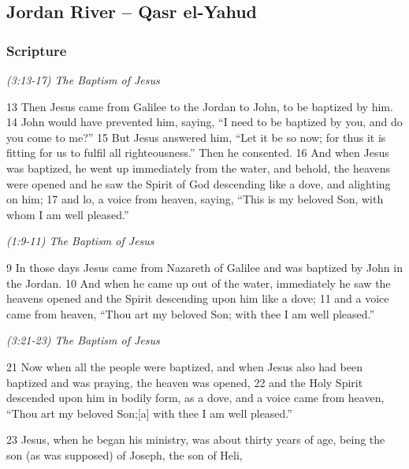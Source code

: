 \documentclass[letterpaper]{report}
\begin{document}
\clearpage
\subsection{Jordan River -- Qasr el-Yahud}
\begin{multicols}{2}
	\mbox{}
\end{multicols}
\subsubsection{Scripture}

{\centering
	\emph{(3:13-17) The Baptism of Jesus}\\
}
\begin{multicols}{2}
13 Then Jesus came from Galilee to the Jordan to John, to be baptized by him. 14 John would have prevented him, saying, “I need to be baptized by you, and do you come to me?” 15 But Jesus answered him, “Let it be so now; for thus it is fitting for us to fulfil all righteousness.” Then he consented. 16 And when Jesus was baptized, he went up immediately from the water, and behold, the heavens were opened and he saw the Spirit of God descending like a dove, and alighting on him; 17 and lo, a voice from heaven, saying, “This is my beloved Son, with whom I am well pleased.”
\end{multicols}

{\centering
	\emph{(1:9-11) The Baptism of Jesus}\\
}
\begin{multicols}{2}
9 In those days Jesus came from Nazareth of Galilee and was baptized by John in the Jordan. 10 And when he came up out of the water, immediately he saw the heavens opened and the Spirit descending upon him like a dove; 11 and a voice came from heaven, “Thou art my beloved Son; with thee I am well pleased.”
\end{multicols}

{\centering
	\emph{(3:21-23) The Baptism of Jesus}\\
}
\begin{multicols}{2}
21 Now when all the people were baptized, and when Jesus also had been baptized and was praying, the heaven was opened, 22 and the Holy Spirit descended upon him in bodily form, as a dove, and a voice came from heaven, “Thou art my beloved Son;[a] with thee I am well pleased.”

23 Jesus, when he began his ministry, was about thirty years of age, being the son (as was supposed) of Joseph, the son of Heli,
\end{multicols}
\end{document}
